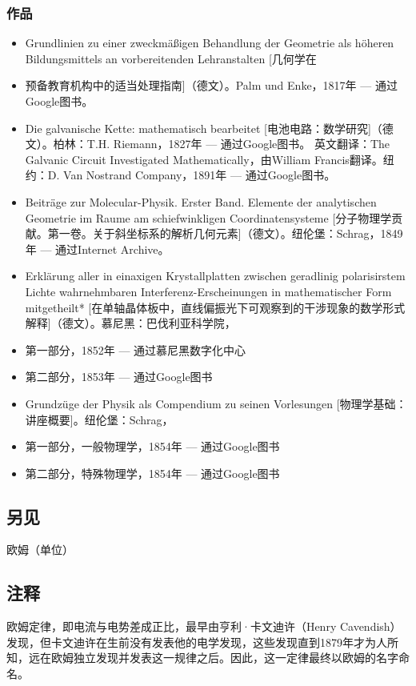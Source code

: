 \subsubsection{作品}  
\begin{itemize}
\item Grundlinien zu einer zweckmäßigen Behandlung der Geometrie als höheren Bildungsmittels an vorbereitenden Lehranstalten [几何学在\item 预备教育机构中的适当处理指南]（德文）。Palm und Enke，1817年 — 通过Google图书。  
\item Die galvanische Kette: mathematisch bearbeitet [电池电路：数学研究]（德文）。柏林：T.H. Riemann，1827年 — 通过Google图书。  
英文翻译：The Galvanic Circuit Investigated Mathematically，由William Francis翻译。纽约：D. Van Nostrand Company，1891年 — 通过Google图书。
\item Beiträge zur Molecular-Physik. Erster Band. Elemente der analytischen Geometrie im Raume am schiefwinkligen Coordinatensysteme [分子物理学贡献。第一卷。关于斜坐标系的解析几何元素]（德文）。纽伦堡：Schrag，1849年 — 通过Internet Archive。  
\item Erklärung aller in einaxigen Krystallplatten zwischen geradlinig polarisirstem Lichte wahrnehmbaren Interferenz-Erscheinungen in mathematischer Form mitgetheilt* [在单轴晶体板中，直线偏振光下可观察到的干涉现象的数学形式解释]（德文）。慕尼黑：巴伐利亚科学院，  
\item 第一部分，1852年 — 通过慕尼黑数字化中心  
\item 第二部分，1853年 — 通过Google图书 
\item Grundzüge der Physik als Compendium zu seinen Vorlesungen [物理学基础：讲座概要]。纽伦堡：Schrag，  
\item 第一部分，一般物理学，1854年 — 通过Google图书  
\item 第二部分，特殊物理学，1854年 — 通过Google图书
\end{itemize}
\subsection{另见}  
欧姆（单位）
\subsection{注释} 
欧姆定律，即电流与电势差成正比，最早由亨利·卡文迪许（Henry Cavendish）发现，但卡文迪许在生前没有发表他的电学发现，这些发现直到1879年才为人所知，远在欧姆独立发现并发表这一规律之后。因此，这一定律最终以欧姆的名字命名。

